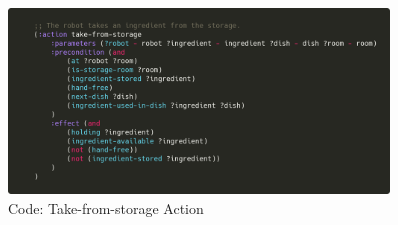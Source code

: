 \documentclass{article}
\begin{document}
\begin{figure}[H]
    \centering
    \includegraphics[width=0.90\textwidth]{assets/take-from-storage.png}
    \caption{Code: Take-from-storage Action}
    \label{fig:act:take}
\end{figure}
\end{document}
